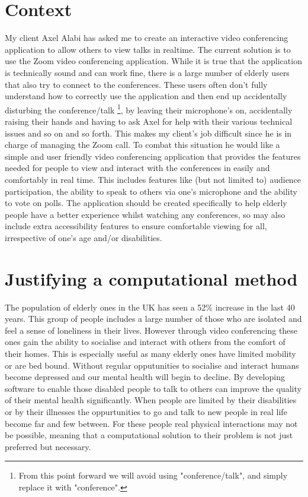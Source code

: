 \section{Context}
\label{sec:context}

My client Axel Alabi has asked me to create an interactive
video conferencing application to allow others to view talks 
in realtime. The current solution is to use the Zoom 
video conferencing application. While it is true that the 
application is technically sound and can work fine, there is a
large number of elderly users that also try to connect to the 
conferences. These users often don't fully understand how to 
correctly use the application and then end up accidentally 
disturbing the conference/talk \footnote{From this point 
forward we will avoid using "conference/talk", and simply
replace it with "conference".}, by leaving their microphone's
on, accidentally raising their hands and having to ask Axel
for help with their various technical issues and so on and so
forth. This makes my client's job difficult since he is in 
charge of managing the Zoom call. To combat this situation 
he would like a simple and user friendly video conferencing 
application that provides the features needed for people to 
view and interact with the conferences in easily and
comfortably in real time. This includes 
features like (but not limited to) audience participation,
the ability to speak to others via one's microphone and the
ability to vote on polls. The application should be
created specifically to help elderly people have a better 
experience whilst watching any conferences, so may also
include extra accessibility features to ensure comfortable
viewing for all, irrespective of one's age and/or disabilities.

\section{Justifying a computational method}
\label{sec:computational}

The population of elderly ones in the UK has seen a 52\% 
increase in the last 40 years. This group of people includes
a large number of those who are isolated and feel a sense of 
loneliness in their lives. However through video conferencing
these ones gain the ability to socialise and interact with 
others from the comfort of their homes. This is especially 
useful as many elderly ones have limited mobility or are bed 
bound. Without regular opputunities to socialise and interact 
humans become depressed and our mental health will begin to 
decline. By developing software to enable those disabled 
people to talk to others can improve the quality of their 
mental health significantly. When people are limited by their 
disabilities or by their illnesses the oppurtunities to go and
talk to new people in real life become far and few between. For
these people real physical interactions may not be possible,
meaning that a computational solution to their problem is not
just preferred but necessary. \vspace{0.2cm}

